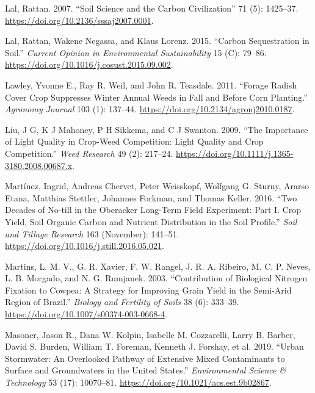 \documentclass[
  12pt,
]{article}
\newlength{\cslhangindent}
\newlength{\cslentryspacingunit} %
\newenvironment{CSLReferences}[2] %
 {%
  \setlength{\parindent}{0pt}
  \ifodd #1
  \let\oldpar\par
  \def\par{\hangindent=\cslhangindent\oldpar}
  \fi
  \setlength{\parskip}{#2\cslentryspacingunit}
 }%
 {}
\begin{document}
\begin{CSLReferences}{1}{0}
\leavevmode{}%
Lal, Rattan. 2007. {``Soil {Science} and the {Carbon Civilization}''} 71 (5): 1425--37. \url{https://doi.org/10.2136/sssaj2007.0001}.

\leavevmode{}%
Lal, Rattan, Wakene Negassa, and Klaus Lorenz. 2015. {``Carbon Sequestration in Soil.''} \emph{Current Opinion in Environmental Sustainability} 15 (C): 79--86. \url{https://doi.org/10.1016/j.cosust.2015.09.002}.

\leavevmode{}%
Lawley, Yvonne E., Ray R. Weil, and John R. Teasdale. 2011. {``Forage {Radish Cover Crop Suppresses Winter Annual Weeds} in {Fall} and {Before Corn Planting}.''} \emph{Agronomy Journal} 103 (1): 137--44. \url{https://doi.org/10.2134/agronj2010.0187}.

\leavevmode{}%
Liu, J G, K J Mahoney, P H Sikkema, and C J Swanton. 2009. {``The Importance of Light Quality in Crop-Weed Competition: {Light} Quality and Crop Competition.''} \emph{Weed Research} 49 (2): 217--24. \url{https://doi.org/10.1111/j.1365-3180.2008.00687.x}.

\leavevmode{}%
Martínez, Ingrid, Andreas Chervet, Peter Weisskopf, Wolfgang G. Sturny, Ararso Etana, Matthias Stettler, Johannes Forkman, and Thomas Keller. 2016. {``Two Decades of No-till in the {Oberacker} Long-Term Field Experiment: {Part I}. {Crop} Yield, Soil Organic Carbon and Nutrient Distribution in the Soil Profile.''} \emph{Soil and Tillage Research} 163 (November): 141--51. \url{https://doi.org/10.1016/j.still.2016.05.021}.

\leavevmode{}%
Martins, L. M. V., G. R. Xavier, F. W. Rangel, J. R. A. Ribeiro, M. C. P. Neves, L. B. Morgado, and N. G. Rumjanek. 2003. {``Contribution of Biological Nitrogen Fixation to Cowpea: A Strategy for Improving Grain Yield in the Semi-Arid Region of {Brazil}.''} \emph{Biology and Fertility of Soils} 38 (6): 333--39. \url{https://doi.org/10.1007/s00374-003-0668-4}.

\leavevmode{}%
Masoner, Jason R., Dana W. Kolpin, Isabelle M. Cozzarelli, Larry B. Barber, David S. Burden, William T. Foreman, Kenneth J. Forshay, et al. 2019. {``Urban {Stormwater}: {An Overlooked Pathway} of {Extensive Mixed Contaminants} to {Surface} and {Groundwaters} in the {United States}.''} \emph{Environmental Science \& Technology} 53 (17): 10070--81. \url{https://doi.org/10.1021/acs.est.9b02867}.


\end{CSLReferences}
\end{document}
